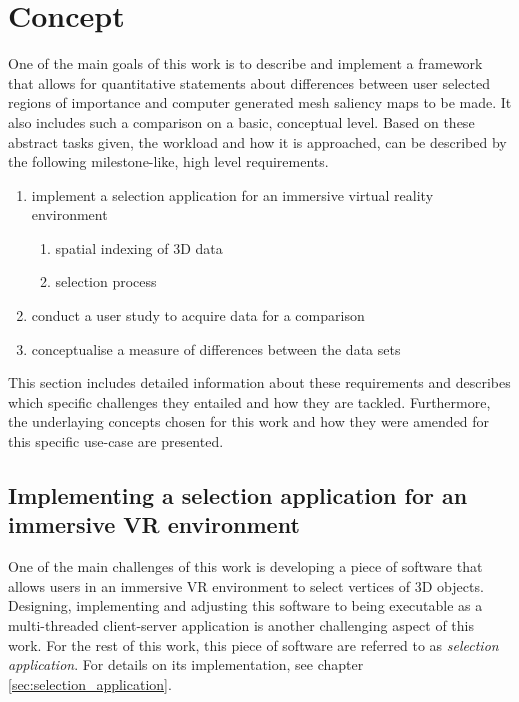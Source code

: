 \chapter{Concept}
\label{sec:concept}

One of the main goals of this work is to describe and implement a framework that allows for quantitative statements about differences between user selected regions of importance and computer generated mesh saliency maps to be made. It also includes such a comparison on a basic, conceptual level. Based on these abstract tasks given, the workload and how it is approached, can be described by the following milestone-like, high level requirements.

\begin{enumerate}
	\item implement a selection application for an immersive virtual reality environment
	\begin{enumerate}
		\item spatial indexing of 3D data
		\item selection process
	\end{enumerate}
	\item conduct a user study to acquire data for a comparison
	\item conceptualise a measure of differences between the data sets
\end{enumerate}

This section includes detailed information about these requirements and describes which specific challenges they entailed and how they are tackled. Furthermore, the underlaying concepts chosen for this work and how they were amended for this specific use-case are presented.

	\section {Implementing a selection application for an immersive VR environment}
	\label{sec:implementing_selection_application_v2c}
One of the main challenges of this work is developing a piece of software that allows users in an immersive VR environment to select vertices of 3D objects. Designing, implementing and adjusting this software to being executable as a multi-threaded client-server application is another challenging aspect of this work. For the rest of this work, this piece of software are referred to as \textit{selection application}. For details on its implementation, see chapter \ref{sec:selection_application}.

